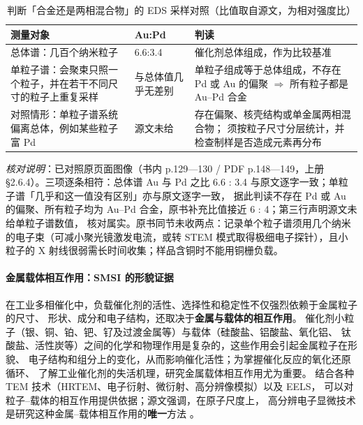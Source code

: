 \begin{table}[htbp]
\centering
\caption{判断「合金还是两相混合物」的 EDS 采样对照（比值取自源文，为相对强度比）}
\label{tab:ch02b-bimetal}
{\srcsize
\begin{tabularx}{\columnwidth}{@{}l l X@{}}
\toprule
测量对象 & Au:Pd & 判读 \\
\midrule
总体谱：几百个纳米粒子 & 6.6:3.4 & 催化剂总体组成，作为比较基准 \\
单粒子谱：会聚束只照一个粒子，并在若干不同尺寸的粒子上重复采样 &
与总体值几乎无差别 & 单粒子组成等于总体组成，不存在 Pd 或 Au 的偏聚
$\Rightarrow$ 所有粒子都是 Au--Pd 合金 \\
对照情形：单粒子谱系统偏离总体，例如某些粒子富 Pd &
源文未给 & 存在偏聚、核壳结构或单金属两相混合物；
须按粒子尺寸分层统计，并检查制样是否造成元素再分布 \\
\bottomrule
\end{tabularx}}
\end{table}

\emph{核对说明}：已对照原页面图像（书内 p.129—130 / PDF p.148—149，上册 §2.6.4）。三项逐条相符：总体谱 Au 与 Pd 之比 6.6 : 3.4 与原文逐字一致；单粒子谱「几乎和这一值没有区别」亦与原文逐字一致，
据此判读不存在 Pd 或 Au 的偏聚、所有粒子均为 Au--Pd 合金，原书补充比值接近 6 : 4；第三行声明源文未给单粒子谱数值，
核对属实。原书同节未收两点：记录单个粒子谱须用几个纳米的电子束（可减小聚光镜激发电流，或转 STEM 模式取得极细电子探针），且小粒子的 X 射线很弱需长时间收集；样品含铜时不能用铜栅负载。


\paragraph{金属载体相互作用：SMSI 的形貌证据}
在工业多相催化中，负载催化剂的活性、选择性和稳定性不仅强烈依赖于金属粒子的尺寸、
形状、成分和电子结构，还取决于\textbf{金属与载体的相互作用}。
催化剂小粒子（银、铜、铂、钯、钌及过渡金属等）与载体（硅酸盐、铝酸盐、氧化铝、
钛酸盐、活性炭等）之间的化学和物理作用是复杂的，这些作用会引起金属粒子在形貌、
电子结构和组分上的变化，从而影响催化活性；为掌握催化反应的氧化还原循环、
了解工业催化剂的失活机理，研究金属载体相互作用尤为重要。
结合各种 TEM 技术（HRTEM、电子衍射、微衍射、高分辨像模拟）以及 EELS，
可以对粒子--载体的相互作用提供依据；源文强调，在原子尺度上，
高分辨电子显微技术是研究这种金属--载体相互作用的\textbf{唯一}方法
。

